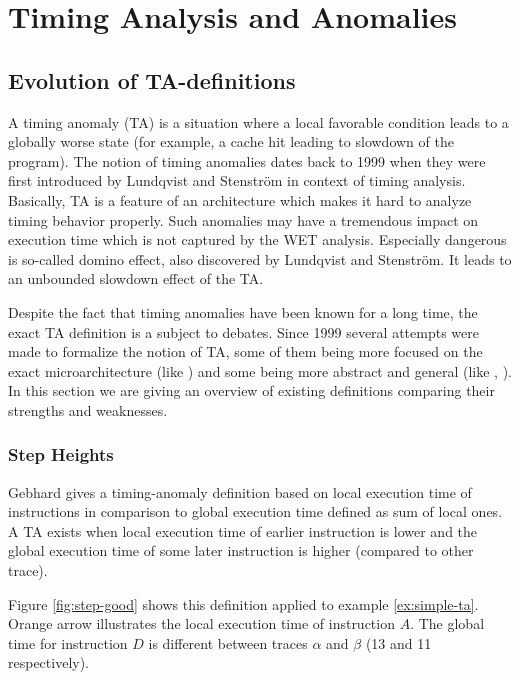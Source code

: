 \chapter{Timing Analysis and Anomalies}

\section{Evolution of TA-definitions}

A timing anomaly (TA) is a situation where a local favorable condition leads to a globally worse state (for example, a cache hit leading to slowdown of the program).  The notion of timing anomalies dates back to 1999 when they were first introduced by Lundqvist and Stenstr\"om \cite{lundqvist_timing_1999} in context of timing analysis. Basically, TA is a feature of an architecture which makes it hard to analyze timing behavior properly. Such anomalies may have a tremendous impact on execution time which is not captured by the WET analysis. Especially dangerous is so-called domino effect, also discovered by Lundqvist and Stenstr\"om. It leads to an unbounded slowdown effect of the TA.

Despite the fact that timing anomalies have been known for a long time, the exact TA definition is a subject to debates. Since 1999 several attempts were made to formalize the notion of TA, some of them being more focused on the exact microarchitecture (like \cite{gruin_minotaur_2023}) and some being more abstract and general (like \cite{binder_definitions_2022}, \cite{hahn_design_2020}). In this section we are giving an overview of existing definitions comparing their strengths and weaknesses.

\subsection{Step Heights}

Gebhard \cite{gebhard_timing_2012} gives a timing-anomaly definition based on local execution time of instructions in comparison to global execution time defined as sum of local ones. A TA exists when local execution time of earlier instruction is lower and the global execution time of some later instruction is higher (compared to other trace).

Figure \ref{fig:step-good} shows this definition applied to example \ref{ex:simple-ta}. Orange arrow illustrates the local execution time of instruction $A$. The global time for instruction $D$ is different between traces $\alpha$ and $\beta$ (13 and 11 respectively).

